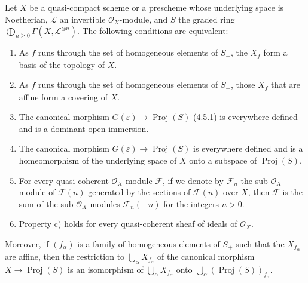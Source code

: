 \begin{theorem}[4.5.2]
\label{II.4.5.2}
Let $X$ be a quasi-compact scheme or a prescheme whose underlying space
is Noetherian, $\mathcal{L}$ an invertible $\mathcal{O}_X$-module, and $S$
the graded ring
$\bigoplus_{n\geq0}\Gamma(X,\mathcal{L}^{\otimes n})$. The following
conditions are equivalent:
\begin{enumerate}
  \item[\rm{a)}] As $f$ runs through the set of homogeneous elements of
  $S_+$, the $X_f$ form a basis of the topology of $X$.
  \item[\rm{a')}] As $f$ runs through the set of homogeneous elements of
  $S_+$, those $X_f$ that are affine form a covering of $X$.
  \item[\rm{b)}] The canonical morphism
  $G(\varepsilon)\to\operatorname{Proj}(S)$
  (\hyperref[II.4.5.1]{4.5.1}) is everywhere defined and is a dominant
  open immersion.


  \item[\rm{b')}] The canonical morphism
  $G(\varepsilon)\to\operatorname{Proj}(S)$ is everywhere defined and is a
  homeomorphism of the underlying space of $X$ onto a subspace of
  $\operatorname{Proj}(S)$.
  \item[\rm{c)}] For every quasi-coherent $\mathcal{O}_X$-module
  $\mathcal{F}$, if we denote by $\mathcal{F}_n$ the
  sub-$\mathcal{O}_X$-module of $\mathcal{F}(n)$ generated by the sections of
  $\mathcal{F}(n)$ over $X$, then $\mathcal{F}$ is the sum of the
  sub-$\mathcal{O}_X$-modules $\mathcal{F}_n(-n)$ for the integers $n>0$.
  \item[\rm{c')}] Property c) holds for every quasi-coherent sheaf
  of ideals of $\mathcal{O}_X$.
\end{enumerate}
Moreover, if $(f_\alpha)$ is a family of homogeneous elements of $S_+$
such that the $X_{f_\alpha}$ are affine, then the restriction to
$\bigcup_\alpha X_{f_\alpha}$ of the canonical morphism
$X\to\operatorname{Proj}(S)$ is an isomorphism of
$\bigcup_\alpha X_{f_\alpha}$ onto
$\bigcup_\alpha(\operatorname{Proj}(S))_{f_\alpha}$.
\end{theorem}

